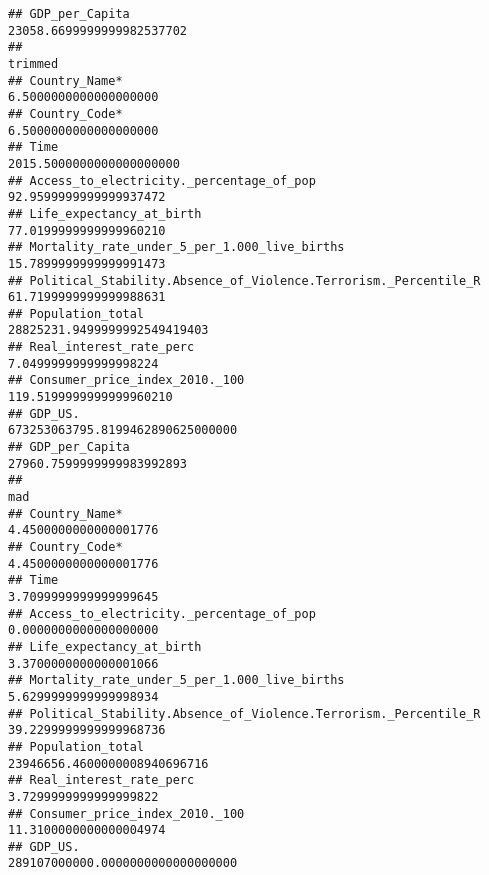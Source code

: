 \documentclass[
]{article}
\begin{document}
\begin{verbatim}
## GDP_per_Capita                                                         23058.6699999999982537702
##                                                                                          trimmed
## Country_Name*                                                              6.5000000000000000000
## Country_Code*                                                              6.5000000000000000000
## Time                                                                    2015.5000000000000000000
## Access_to_electricity._percentage_of_pop                                  92.9599999999999937472
## Life_expectancy_at_birth                                                  77.0199999999999960210
## Mortality_rate_under_5_per_1.000_live_births                              15.7899999999999991473
## Political_Stability.Absence_of_Violence.Terrorism._Percentile_R           61.7199999999999988631
## Population_total                                                    28825231.9499999992549419403
## Real_interest_rate_perc                                                    7.0499999999999998224
## Consumer_price_index_2010._100                                           119.5199999999999960210
## GDP_US.                                                         673253063795.8199462890625000000
## GDP_per_Capita                                                         27960.7599999999983992893
##                                                                                              mad
## Country_Name*                                                              4.4500000000000001776
## Country_Code*                                                              4.4500000000000001776
## Time                                                                       3.7099999999999999645
## Access_to_electricity._percentage_of_pop                                   0.0000000000000000000
## Life_expectancy_at_birth                                                   3.3700000000000001066
## Mortality_rate_under_5_per_1.000_live_births                               5.6299999999999998934
## Political_Stability.Absence_of_Violence.Terrorism._Percentile_R           39.2299999999999968736
## Population_total                                                    23946656.4600000008940696716
## Real_interest_rate_perc                                                    3.7299999999999999822
## Consumer_price_index_2010._100                                            11.3100000000000004974
## GDP_US.                                                         289107000000.0000000000000000000

\end{verbatim}
\end{document}
